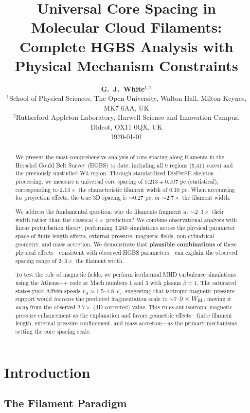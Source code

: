 \documentclass[11pt,a4paper]{article}
\title{\textbf{Universal Core Spacing in Molecular Cloud Filaments:\\
Complete HGBS Analysis with Physical Mechanism Constraints}}
\author{\textbf{G.~J.~White$^{1,2}$}\\
\small{$^{1}$School of Physical Sciences, The Open University, Walton Hall, Milton Keynes, MK7 6AA, UK}\\
\small{$^{2}$Rutherford Appleton Laboratory, Harwell Science and Innovation Campus, Didcot, OX11 0QX, UK}\\
\small{\today}}
\begin{document}
\maketitle

\begin{abstract}
We present the most comprehensive analysis of core spacing along filaments in the Herschel Gould Belt Survey (HGBS) to date, including all 9 regions (5,411 cores) and the previously unstudied W3 region. Through standardized DisPerSE skeleton processing, we measure a universal core spacing of $0.213 \pm 0.007$ pc (statistical), corresponding to $2.13\times$ the characteristic filament width of $0.10$ pc. When accounting for projection effects, the true 3D spacing is $\sim0.27$ pc, or $\sim2.7\times$ the filament width.

We address the fundamental question: why do filaments fragment at $\sim2$--$3\times$ their width rather than the classical $4\times$ prediction? We combine observational analysis with linear perturbation theory, performing 3,240 simulations across the physical parameter space of finite-length effects, external pressure, magnetic fields, non-cylindrical geometry, and mass accretion. We demonstrate that \textbf{plausible combinations} of these physical effects—consistent with observed HGBS parameters—can explain the observed spacing range of $2$--$3\times$ the filament width.

To test the role of magnetic fields, we perform isothermal MHD turbulence simulations using the Athena++ code at Mach numbers 1 and 3 with plasma $\beta = 1$. The saturated states yield Alfv\'en speeds $v_A \approx 1.5$--$1.8$~$c_s$, suggesting that isotropic magnetic pressure support would \textit{increase} the predicted fragmentation scale to $\sim7$--$9\times W_{\rm fil}$, moving it \textit{away} from the observed $2.7\times$ (3D-corrected) value. This rules out isotropic magnetic pressure enhancement as the explanation and favors geometric effects—finite filament length, external pressure confinement, and mass accretion—as the primary mechanisms setting the core spacing scale.
\end{abstract}

\section{Introduction}

\subsection{The Filament Paradigm}
\end{document}
